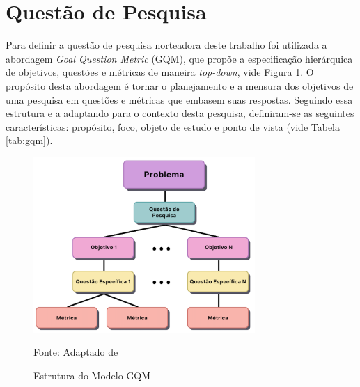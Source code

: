 \section{Questão de Pesquisa} 
\label{sec:questao}

Para definir a questão de pesquisa norteadora deste trabalho foi utilizada a abordagem \textit{Goal Question Metric} (GQM), que propõe a especificação hierárquica de objetivos, questões e métricas de maneira \textit{top-down}, vide Figura \ref{fig:GOAL_QUESTION_METRIC}. O propósito desta abordagem é tornar o planejamento e a mensura dos objetivos de uma pesquisa em questões e métricas que embasem suas respostas. Seguindo essa estrutura e a adaptando para o contexto desta pesquisa, definiram-se as seguintes características: propósito, foco, objeto de estudo e ponto de vista (vide Tabela \ref{tab:gqm}). 

\begin{figure}[h] 
    \centering
    \caption{Estrutura do Modelo GQM}
    \includegraphics[width=0.75\textwidth]{figuras/gqm.png}

    \begin{center}
    \text Fonte: Adaptado de  
    
    \end{center}
    \label{fig:GOAL_QUESTION_METRIC}
\end{figure}


